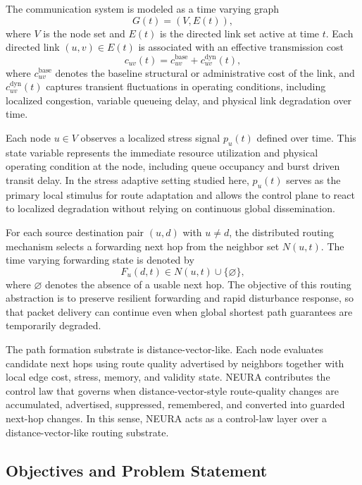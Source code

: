 \documentclass[5p,times]{elsarticle}
\begin{document}
The communication system is modeled as a time varying graph
\begin{equation}
G(t) = (V, E(t)),
\end{equation}
where $V$ is the node set and $E(t)$ is the directed link set active at time $t$. Each directed link $(u,v) \in E(t)$ is associated with an effective transmission cost
\begin{equation}
c_{uv}(t) = c^{\mathrm{base}}_{uv} + c^{\mathrm{dyn}}_{uv}(t),
\end{equation}
where $c^{\mathrm{base}}_{uv}$ denotes the baseline structural or administrative cost of the link, and $c^{\mathrm{dyn}}_{uv}(t)$ captures transient fluctuations in operating conditions, including localized congestion, variable queueing delay, and physical link degradation over time.

Each node $u \in V$ observes a localized stress signal $p_u(t)$ defined over time. This state variable represents the immediate resource utilization and physical operating condition at the node, including queue occupancy and burst driven transit delay. In the stress adaptive setting studied here, $p_u(t)$ serves as the primary local stimulus for route adaptation and allows the control plane to react to localized degradation without relying on continuous global dissemination.

For each source destination pair $(u,d)$ with $u \neq d$, the distributed routing mechanism selects a forwarding next hop from the neighbor set $N(u,t)$. The time varying forwarding state is denoted by
\begin{equation}
F_u(d,t) \in N(u,t) \cup \{\varnothing\},
\end{equation}
where $\varnothing$ denotes the absence of a usable next hop. The objective of this routing abstraction is to preserve resilient forwarding and rapid disturbance response, so that packet delivery can continue even when global shortest path guarantees are temporarily degraded.

The path formation substrate is distance-vector-like. Each node evaluates candidate next hops using route quality advertised by neighbors together with local edge cost, stress, memory, and validity state. NEURA contributes the control law that governs when distance-vector-style route-quality changes are accumulated, advertised, suppressed, remembered, and converted into guarded next-hop changes. In this sense, NEURA acts as a control-law layer over a distance-vector-like routing substrate.

\subsection{Objectives and Problem Statement}
\end{document}
